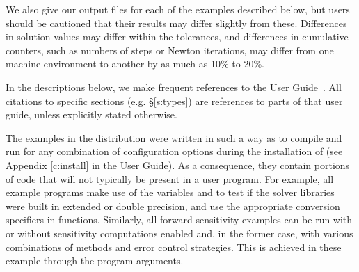 We also give our output files for each of the examples described below,
but users should be cautioned that their results may differ slightly from these.
Differences in solution values may differ within the tolerances, and differences
in cumulative counters, such as numbers of steps or Newton iterations, may differ
from one machine environment to another by as much as 10\% to 20\%.

In the descriptions below, we make frequent references to the {\idas}
User Guide~\cite{idas_ug}.  All citations to specific sections
(e.g. \S\ref{s:types}) are references to parts of that user guide, unless
explicitly stated otherwise.

\vspace{0.2in}
The examples in the {\idas} distribution were written in such a way as
to compile and run for any combination of configuration options during
the installation of {\sundials} (see Appendix \ref{c:install} in the User Guide).
As a consequence, they contain portions of code that will not typically be present in a
user program. For example, all example programs make use of the
variables  and 
to test if the solver libraries
were built in extended or double precision, and use the appropriate conversion 
specifiers in  functions. Similarly, all forward sensitivity
examples can be run with or without sensitivity computations enabled and,
in the former case, with various combinations of methods and error control 
strategies. This is achieved in these example through the program arguments.

